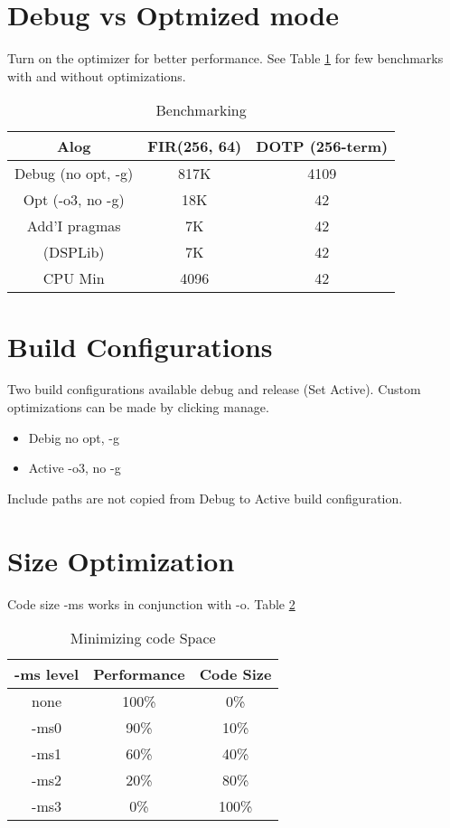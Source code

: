\documentclass{article}
\begin{document}
\section{Debug vs Optmized mode}
Turn on the optimizer for better performance. See Table
\ref{table:benchmarking} for few benchmarks with and without optimizations.
\begin{table}
\caption{Benchmarking}
\centering
\begin{tabular}{|c | c | c|}
\hline \hline
Alog & FIR(256, 64) & DOTP (256-term)\\
\hline \hline
Debug (no opt, -g) & 817K & 4109\\
\hline
Opt (-o3, no -g) & 18K & 42\\
\hline
Add'I pragmas & 7K & 42\\
\hline
(DSPLib) & 7K & 42\\
\hline
CPU Min & 4096 & 42\\
\hline \hline
\end{tabular}
\label{table:benchmarking}
\end{table}
\section{Build Configurations}
Two build configurations available debug and release (Set Active). Custom
optimizations can be made by clicking manage.
\begin{itemize}
\item Debig no opt, -g
\item Active -o3, no -g
\end{itemize}
Include paths are not copied from Debug to Active build
configuration. 
\section{Size Optimization}
Code size -ms works in conjunction with -o. Table \ref{table:codeSize}
\begin{table}
\caption{Minimizing code Space}
\centering
\begin{tabular}{|c| c| c| }
\hline \hline
-ms level & Performance & Code Size\\
\hline
none & 100\% & 0\%\\
\hline
-ms0 & 90\%  & 10\%\\
\hline
-ms1 & 60\%  & 40\%\\
\hline
-ms2 & 20\%  & 80\%\\
\hline
-ms3 & 0\%   & 100\%\\
\hline \hline
\end{tabular}
\label{table:codeSize}
\end{table}
\end{document}
